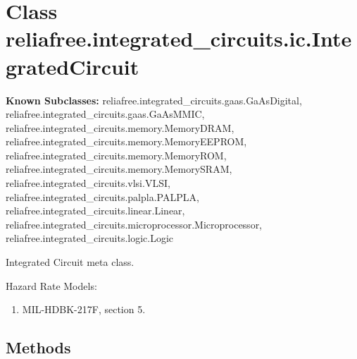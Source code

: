 %
%
%


\section{Class reliafree.integrated\_circuits.ic.IntegratedCircuit}

    \label{reliafree:integrated_circuits:ic:IntegratedCircuit}
\textbf{Known Subclasses:}
reliafree.integrated\_circuits.gaas.GaAsDigital,
    reliafree.integrated\_circuits.gaas.GaAsMMIC,
    reliafree.integrated\_circuits.memory.MemoryDRAM,
    reliafree.integrated\_circuits.memory.MemoryEEPROM,
    reliafree.integrated\_circuits.memory.MemoryROM,
    reliafree.integrated\_circuits.memory.MemorySRAM,
    reliafree.integrated\_circuits.vlsi.VLSI,
    reliafree.integrated\_circuits.palpla.PALPLA,
    reliafree.integrated\_circuits.linear.Linear,
    reliafree.integrated\_circuits.microprocessor.Microprocessor,
    reliafree.integrated\_circuits.logic.Logic

Integrated Circuit meta class.

Hazard Rate Models:

\begin{enumerate}

\setlength{\parskip}{0.5ex}
  \item MIL-HDBK-217F, section 5.

\end{enumerate}



  \subsection{Methods}

